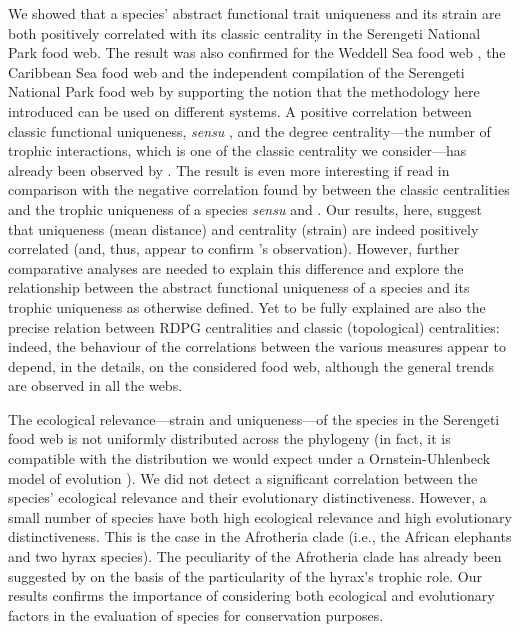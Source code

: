 \documentclass[]{rsos}%
\begin{document}
We showed that a species' abstract functional trait uniqueness and its strain are both positively
correlated with its classic centrality in the Serengeti National Park food web.
The result was also confirmed for the Weddell Sea food web
\citep{jennings2002long}, the Caribbean Sea food web \citep{opitz1996trophic}
and the independent compilation of the Serengeti National Park food web by \citet{de2011serengeti}
supporting the notion that the methodology here introduced can be used on different
systems. A positive correlation between classic functional uniqueness, \emph{sensu}
\citet{yodzis1999search},  and the degree centrality---the number of trophic
interactions, which is one of the classic centrality we consider---has already
been observed by \citet{petchey2008trophically}.  The
result is even more interesting if read in comparison with the negative
correlation found by \citet{lai2012centrality} between the classic centralities
and the trophic uniqueness of a species \emph{sensu} \citet{luczkovich2003defining}
and \citet{jordan2009trophic}. Our results, here, suggest that uniqueness (mean distance)
and centrality (strain) are indeed positively correlated (and, thus, appear to confirm  \citet{petchey2008trophically}'s
observation). However, further comparative analyses are
needed to explain this difference and explore the relationship between the abstract
functional uniqueness of a species and its trophic uniqueness as otherwise
defined. Yet to be fully explained are also the precise relation between RDPG centralities
and classic (topological) centralities: indeed, the behaviour of the correlations between the
various measures appear to depend, in the details, on the considered food web, although
the general trends are observed in all the webs.

The ecological relevance---strain and uniqueness---of the species in the Serengeti food web
is not uniformly distributed across the phylogeny (in fact, it is compatible with the distribution
we would expect under a Ornstein-Uhlenbeck model of evolution \citep{hansen1997stabilizing}). We did not detect a
significant correlation between the species' ecological relevance and their
evolutionary distinctiveness. However, a small number of species have both
high ecological relevance and high evolutionary distinctiveness. This is the
case in the Afrotheria clade (i.e., the African elephants and two hyrax species).
The peculiarity of the Afrotheria clade has already been suggested by \citet{baskerville2011spatial}
on the basis of the particularity of the hyrax's trophic role.
Our results confirms the importance of considering both ecological and evolutionary factors
in the evaluation of species for conservation purposes.

\small
\singlespacing

\end{document}
